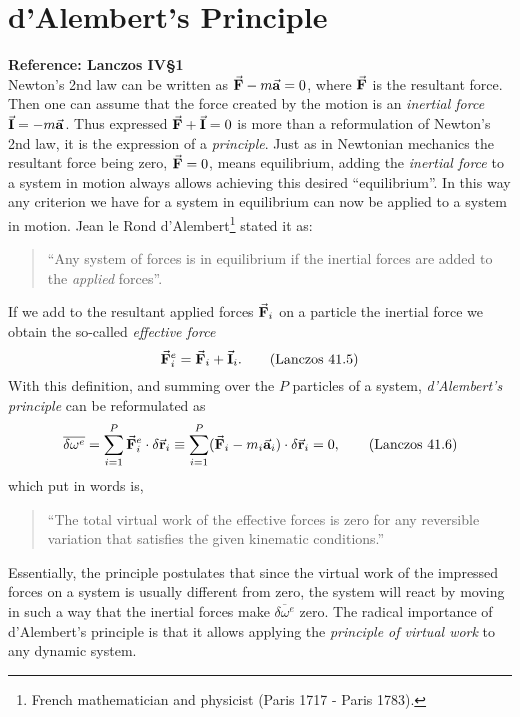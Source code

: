 \documentclass[12pt, english, a4paper]{article}
\begin{document}
\section{d'Alembert's Principle}
\textbf{Reference: Lanczos IV\S1}\\
Newton's 2nd law can be written as \(\va{F}- m \va{a}= 0 \), where \(\va{F}\) is the resultant force.
Then one can assume that the force created by the motion is an \emph{inertial force} \(\va{I}= - m \va{a}\).
Thus expressed \(\va{F}+ \va{I}=0\) is more than a reformulation of Newton's 2nd law, it is the expression of a \emph{principle}.
Just as in Newtonian mechanics the resultant force being zero, \(\va{F}=0\), means equilibrium, adding the \emph{inertial force} to a system in motion always allows achieving this desired ``equilibrium''.
In this way any criterion we have for a system in equilibrium can now be applied to a system in motion.
Jean le Rond d'Alembert\footnote{French mathematician and physicist (Paris 1717 - Paris 1783).} stated it as:
\begin{quote}
``Any system of forces is in equilibrium if the inertial forces are added to the \emph{applied} forces''.
\end{quote}
If we add to the resultant applied forces \(\va{F}_i\) on a particle the inertial force we obtain the so-called \emph{effective force}
\begin{equation}\label{Lanczos41.5}
 \va{F}^e_i= \va{F}_i + \va{I}_i.
 \tag{Lanczos 41.5}
\end{equation}
With this definition, and summing over the \(P\) particles of a system, \emph{d'Alembert's principle} can be reformulated as
\begin{equation}\label{Lanczos41.6}
 \overline {\delta \omega^e} =
 \displaystyle\sum_{i=1}^P \va{F}^e_i \cdot \delta \va{r}_i \equiv
 \displaystyle\sum_{i=1}^P (\va{F}_i - m_i \va{a}_i) \cdot \delta \va{r}_i = 0,
 \tag{Lanczos 41.6}
\end{equation}
which put in words is,
\begin{quote}
 ``The total virtual work of the effective forces is zero for any reversible variation that satisfies the given kinematic conditions.''
\end{quote}
Essentially, the principle postulates that since the virtual work of the impressed forces on a system is usually different from zero, the system will react by moving in such a way that the inertial forces make \(\overline {\delta \omega^e}\) zero.
The radical importance of d'Alembert's principle is that it allows applying the \emph{principle of virtual work} to any dynamic system.
\end{document}
